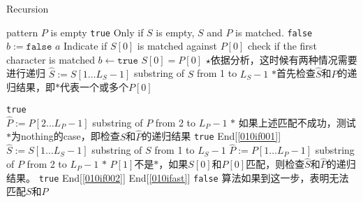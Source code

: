 \setcounter{algorithm}{0}
\begin{algorithm}[H]
\caption{Recursion}
\begin{algorithmic}[1]
 \Comment pattern $P$ is empty
\State \Return \texttt{true} \Comment Only if $S$ is empty, $S$ and $P$ is matched.
\Else
\State \Return \texttt{false}
\EndIf
\EndIf
\State $b:=\texttt{false}$ \Comment $a$ Indicate if $S[0]$ is matched against $P[0]$
 \Comment check if the first character is matched
\State $b\gets \texttt{true}$ \Comment $S[0]=P[0]$
\EndIf
{} \label{010ifast}
\State $\star$依据分析，这时候有两种情况需要进行递归
\State $\hat{S}:=S[1\ldots L_S-1]$ \Comment substring of $S$ from 1 to $L_S-1$
\State $\ast$首先检查$\hat{S}$和$P$的递归结果，即$\ast$代表一个或多个$P[0]$
\end{algorithmic}
\end{algorithm}
\begin{algorithm}[H]
\begin{algorithmic}[1]
 \label{010if001}
\State \Return \texttt{true}
\Else\\
\State $\hat{P}:=P[2\ldots L_P-1]$ \Comment substring of $P$ from 2 to $L_P-1$
\State $\ast$ 如果上述匹配不成功，测试$\ast$为nothing的case，即检查$S$和$\hat{P}$的递归结果
\State \Return \texttt{true}
\EndIf
\EndIf \Comment End[\ref{010if001}]
\Else
\State $\hat{S}:=S[1\ldots L_S-1]$ \Comment substring of $S$ from 1 to $L_S-1$
\State $\hat{P}:=P[1\ldots L_P-1]$ \Comment substring of $P$ from 2 to $L_P-1$
\State $\ast$ $P[1]$不是$\ast$，如果$S[0]$和$P[0]$匹配，则检查$\hat{S}$和$\hat{P}$的递归结果。
 \label{010if002}
\State \Return \texttt{true}
\EndIf \Comment End[\ref{010if002}]
\EndIf \Comment End[\ref{010ifast}]
\State \Return \texttt{false} \Comment 算法如果到这一步，表明无法匹配$S$和$P$
\EndProcedure
\end{algorithmic}
\end{algorithm}
\setcounter{lstlisting}{0}
